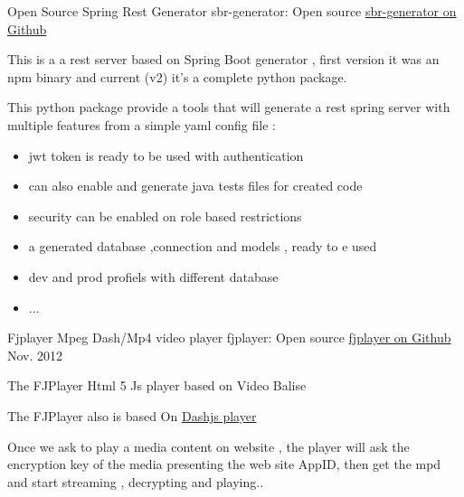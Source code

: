 \documentclass[11pt, a4paper]{awesome-cv} %
\begin{document}
\begin{cventries}

    \cventry
    {Open Source Spring Rest Generator } %
    {sbr-generator: Open source} %
    { \href{https://github.com/medazzo/sbr-generator}{sbr-generator on Github} }%
    {} %
    { %
        \begin{cvitems}
            \item {This is a a rest server based on Spring Boot generator , first version it was an npm binary and current (v2) it's a complete python package.}
            \item {This python package provide a tools that will generate a rest spring server with multiple features from a simple yaml config file :}
            \begin{itemize}
                \item {jwt token is ready to be used with authentication}
                \item {can also enable and generate java tests files for created code }
                \item {security can be enabled on role based restrictions}
                \item {a generated database ,connection and models , ready to e used}
                \item {dev and prod profiels with different database}
                \item {...}
            \end{itemize}
        \end{cvitems}
    }


    \cventry
    {Fjplayer Mpeg Dash/Mp4 video player  } %
    {fjplayer: Open source } %
    { \href{hhttps://github.com/medazzo/fjplayer}{fjplayer on Github} } %
    {Nov. 2012} %
    { %
        \begin{cvitems}
            \item {The FJPlayer Html 5 Js player based on Video Balise }
            \item {The FJPlayer also is based On \href{http://dashif.org/reference/players/javascript/1.4.0/samples/dash-if-reference-player/}{Dashjs player} }
            \item {Once we ask to play a media content on website , the player will ask the encryption key of the media presenting the web site AppID, then get the mpd and start streaming , decrypting  and playing..}
        \end{cvitems}
    }


\end{cventries}
\end{document}
